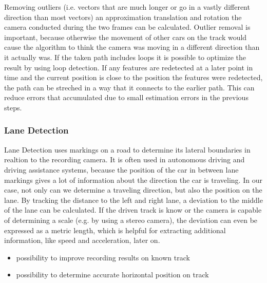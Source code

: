 Removing outliers (i.e. vectors that are much longer or go in a vastly different direction than most vectors) an approximation translation and rotation the camera conducted during the two frames can be calculated.
Outlier removal is important, because otherwise the movement of other cars on the track would cause the algorithm to think the camera was moving in a different direction than it actually was.
If the taken path includes loops it is possible to optimize the result by using loop detection. If any features are redetected at a later point in time and the current position is close to the position the features were redetected, the path can be streched in a way that it connects to the earlier path.
This can reduce errors that accumulated due to small estimation errors in the previous steps.


\subsubsection{Lane Detection}
Lane Detection uses markings on a road to determine its lateral boundaries in realtion to the recording camera. It is often used in autonomous driving and driving assistance systems, because the position of the car in between lane markings gives a lot of information about the direction the car is traveling. 
In our case, not only can we determine a traveling direction, but also the position on the lane.
By tracking the distance to the left and right lane, a deviation to the middle of the lane can be calculated. 
If the driven track is know or the camera is capable of determining a scale (e.g. by using a stereo camera), the deviation can even be expressed as a metric length, which is helpful for extracting additional information, like speed and acceleration, later on.


\begin{itemize}
  \item possibility to improve recording results on known track
  \item possibility to determine accurate horizontal position on track
\end{itemize}

